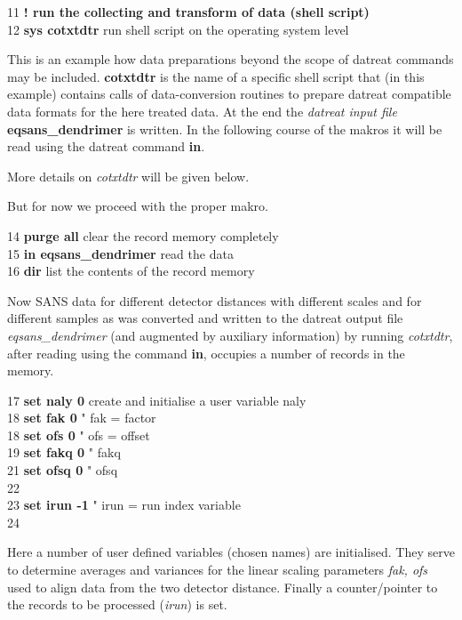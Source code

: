 \documentclass[11pt,fleqn]{book} %
\newcommand{\linespace}{\vspace{4ex}}
\newcommand{\return}{$\carriagereturn$} %
\newcommand{\sysprompt}{{\color{green}...\textgreater} ~ }
\newcommand{\enter}[1]{{\color{red} \bf #1}}
\newcommand{\expl}[1]{\hskip 0.5cm {\color{explgray} #1}}
\begin{document}
\begin{corollary}
11 {\bf ! run the collecting and transform of data (shell script)} \\
12 {\bf sys cotxtdtr} \expl{run shell script on the operating system level}
\end{corollary}
This is an example how data preparations beyond the scope of datreat commands
may be included. {\bf cotxtdtr} is the name of a specific shell script that 
(in this example) contains calls of data-conversion routines to prepare
datreat compatible data formats for the here treated data. At the end the
\emph{datreat input file} {\bf eqsans\_dendrimer} is written. In the following course
of the makros it will be read using the datreat command {\bf in}.

More details on \emph{cotxtdtr} will be given below.

But for now we proceed with the proper makro.

\begin{corollary}
14 {\bf purge all} \expl{clear the record memory completely} \\
15 {\bf in eqsans\_dendrimer} \expl{read the data} \\
16 {\bf dir} \expl{list the contents of the record memory} 
\end{corollary}

Now SANS data for different detector distances with different scales and for different samples 
as was converted and written to the datreat output file \emph{eqsans\_dendrimer} (and augmented by auxiliary information) by running \emph{cotxtdtr}, after reading using the command {\bf in},
occupies a number of records in the memory. 

\linespace

\begin{corollary}
17 {\bf set naly 0} \expl{create and initialise a user variable naly} \\
18 {\bf set fak 0} \expl{ " fak = factor} \\
18 {\bf set ofs 0} \expl{ " ofs = offset} \\
19 {\bf set fakq 0} \expl{ " fakq } \\
21 {\bf set ofsq 0} \expl{ " ofsq } \\
22 \\
23  {\bf set irun -1} \expl{ " irun = run index variable } \\
24
\end{corollary}
Here a number of user defined variables (chosen names) are initialised. They serve to
determine averages and variances for the linear scaling parameters \emph{fak, ofs} used to align 
data from the two detector distance.
Finally a counter/pointer to the records to be processed (\emph{irun}) is set.
\end{document}
